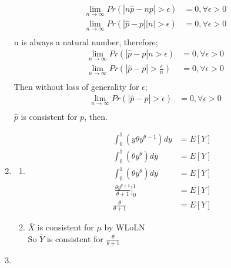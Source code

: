 \documentclass{article}
\begin{document}
\begin{enumerate}
\begin{equation*}
	\begin{split}
	\lim_{n\rightarrow \infty} Pr(\left| n\hat{p} - np \right| > \epsilon) &= 0, \forall \epsilon > 0 \\
	\lim_{n\rightarrow \infty} Pr(\left| \hat{p} - p \right|\left|n\right| > \epsilon) &= 0, \forall \epsilon > 0 \\
	\end{split}
	\end{equation*}	
	n is always a natural number, therefore;
	\begin{equation*}
	\begin{split}
	\lim_{n\rightarrow \infty} Pr(\left| \hat{p} - p \right|n > \epsilon) &= 0, \forall \epsilon > 0 \\
	\lim_{n\rightarrow \infty} Pr(\left| \hat{p} - p \right| > \frac{\epsilon}{n}) &= 0, \forall \epsilon > 0 \\
	\end{split}
	\end{equation*}
	Then without loss of generality for $\epsilon$;
	\begin{equation*}
	\begin{split}
	\lim_{n\rightarrow \infty} Pr(\left| \hat{p} - p \right| > \epsilon) &= 0, \forall \epsilon > 0 \\
	\end{split}
	\end{equation*}
	$\hat{p}$ is consistent for $p$, then.
\item
	\begin{enumerate}
	\item
		\begin{equation*}
		\begin{split}
		\int_{0}^{1} (y\theta y^{\theta-1})dy &= E[Y]\\
		\int_{0}^{1} (\theta y^{\theta})dy &= E[Y]\\
		\int_{0}^{1} (\theta y^{\theta})dy &= E[Y]\\\
		\frac{\theta y ^{\theta+1}}{\theta+1}]_{0}^{1} &= E[Y] \\
		\frac{\theta}{\theta+1} &= E[Y]
		\end{split}
		\end{equation*}	
	\item
		$\bar{X}$ is consistent for $\mu$ by WLoLN \\
		So $\bar{Y}$ is consistent for $\frac{\theta}{\theta+1}$ \\
	\end{enumerate}
\item
	\begin{enumerate}

\end{enumerate}
\end{enumerate}
\end{document}
